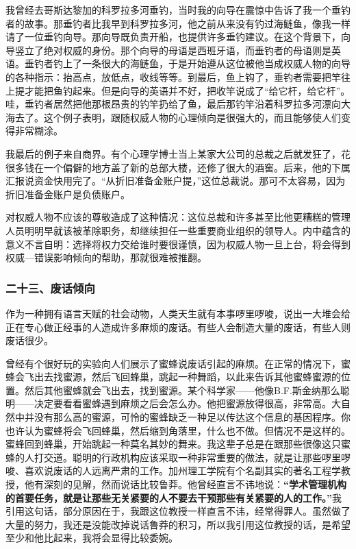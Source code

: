 我曾经去哥斯达黎加的科罗拉多河垂钓，当时我的向导在震惊中告诉了我一个垂钓者的故事。那垂钓者比我早到科罗拉多河，他之前从来没有钓过海鲢鱼，像我一样请了一位垂钓向导。那向导既负责开船，也提供许多垂钓建议。在这个背景下，向导竖立了绝对权威的身份。那个向导的母语是西班牙语，而垂钓者的母语则是英语。垂钓者钓上了一条很大的海鲢鱼，于是开始遵从这位被他当成权威人物的向导的各种指示：抬高点，放低点，收线等等。到最后，鱼上钩了，垂钓者需要把竿往上提才能把鱼钓起来。但是向导的英语并不好，把收竿说成了“给它杆，给它杆”。哇，垂钓者居然把他那根昂贵的钓竿扔给了鱼，最后那钓竿沿着科罗拉多河漂向大海去了。这个例子表明，跟随权威人物的心理倾向是很强大的，而且能够使人们变得非常糊涂。
\par

我最后的例子来自商界。有个心理学博士当上某家大公司的总裁之后就发狂了，花很多钱在一个偏僻的地方盖了新的总部大楼，还修了很大的酒窖。后来，他的下属汇报说资金快用完了。“从折旧准备金账户提，”这位总裁说。那可不太容易，因为折旧准备金账户是负债账户。
\par

对权威人物不应该的尊敬造成了这种情况：这位总裁和许多甚至比他更糟糕的管理人员明明早就该被革除职务，却继续担任一些重要商业组织的领导人。内中蕴含的意义不言自明：选择将权力交给谁时要很谨慎，因为权威人物一旦上台，将会得到权威—错误影响倾向的帮助，那就很难被推翻。
\par

\subsubsection*{二十三、废话倾向}

作为一种拥有语言天赋的社会动物，人类天生就有本事啰里啰唆，说出一大堆会给正在专心做正经事的人造成许多麻烦的废话。有些人会制造大量的废话，有些人则废话很少。
\par

曾经有个很好玩的实验向人们展示了蜜蜂说废话引起的麻烦。在正常的情况下，蜜蜂会飞出去找蜜源，然后飞回蜂巢，跳起一种舞蹈，以此来告诉其他蜜蜂蜜源的位置。然后其他蜜蜂就会飞出去，找到蜜源。某个科学家——他像B.F.斯金纳那么聪明——决定要看看蜜蜂遇到麻烦之后会怎么办。他把蜜源放得很高，非常高。大自然中并没有那么高的蜜源，可怜的蜜蜂缺乏一种足以传达这个信息的基因程序。你也许认为蜜蜂将会飞回蜂巢，然后缩到角落里，什么也不做。但情况不是这样的。蜜蜂回到蜂巢，开始跳起一种莫名其妙的舞来。我这辈子总是在跟那些很像这只蜜蜂的人打交道。聪明的行政机构应该采取一种非常重要的做法，就是让那些啰里啰唆、喜欢说废话的人远离严肃的工作。加州理工学院有个名副其实的著名工程学教授，他有深刻的见解，然而说话比较鲁莽。他曾经直言不讳地说：\textbf{“学术管理机构的首要任务，就是让那些无关紧要的人不要去干预那些有关紧要的人的工作。”}我引用这句话，部分原因在于，我跟这位教授一样直言不讳，经常得罪人。虽然做了大量的努力，我还是没能改掉说话鲁莽的积习，所以我引用这位教授的话，是希望至少和他比起来，我将会显得比较委婉。
\par


